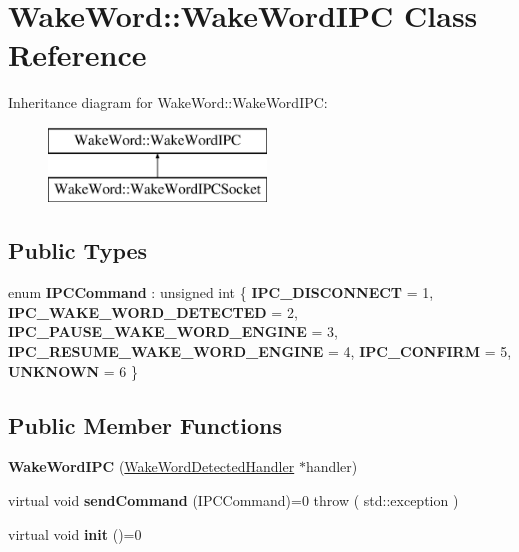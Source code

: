 \hypertarget{classWakeWord_1_1WakeWordIPC}{}\section{Wake\+Word\+:\+:Wake\+Word\+I\+PC Class Reference}
\label{classWakeWord_1_1WakeWordIPC}
Inheritance diagram for Wake\+Word\+:\+:Wake\+Word\+I\+PC\+:\begin{figure}[H]
\begin{center}
\leavevmode
\includegraphics[height=2.000000cm]{df/d0a/classWakeWord_1_1WakeWordIPC}
\end{center}
\end{figure}
\subsection*{Public Types}
\begin{DoxyCompactItemize}
\item 
\mbox{\label{classWakeWord_1_1WakeWordIPC_ab11612d88ce76a24d25dcc3c9def7bec}} 
enum {\bfseries I\+P\+C\+Command} \+: unsigned int \{ \newline
{\bfseries I\+P\+C\+\_\+\+D\+I\+S\+C\+O\+N\+N\+E\+CT} = 1, 
{\bfseries I\+P\+C\+\_\+\+W\+A\+K\+E\+\_\+\+W\+O\+R\+D\+\_\+\+D\+E\+T\+E\+C\+T\+ED} = 2, 
{\bfseries I\+P\+C\+\_\+\+P\+A\+U\+S\+E\+\_\+\+W\+A\+K\+E\+\_\+\+W\+O\+R\+D\+\_\+\+E\+N\+G\+I\+NE} = 3, 
{\bfseries I\+P\+C\+\_\+\+R\+E\+S\+U\+M\+E\+\_\+\+W\+A\+K\+E\+\_\+\+W\+O\+R\+D\+\_\+\+E\+N\+G\+I\+NE} = 4, 
\newline
{\bfseries I\+P\+C\+\_\+\+C\+O\+N\+F\+I\+RM} = 5, 
{\bfseries U\+N\+K\+N\+O\+WN} = 6
 \}
\end{DoxyCompactItemize}
\subsection*{Public Member Functions}
\begin{DoxyCompactItemize}
\item 
\mbox{\label{classWakeWord_1_1WakeWordIPC_a7ed1b605b26a0b1428eec707eccda117}} 
{\bfseries Wake\+Word\+I\+PC} (\hyperlink{classWakeWord_1_1WakeWordDetectedHandler}{Wake\+Word\+Detected\+Handler} $\ast$handler)
\item 
\mbox{\label{classWakeWord_1_1WakeWordIPC_af304616b24f8d23b8716c3c31457c2a4}} 
virtual void {\bfseries send\+Command} (I\+P\+C\+Command)=0  throw ( std\+::exception )
\item 
\mbox{\label{classWakeWord_1_1WakeWordIPC_ae3b0dccdf463d27141cb942853c9a008}} 
virtual void {\bfseries init} ()=0
\end{DoxyCompactItemize}
